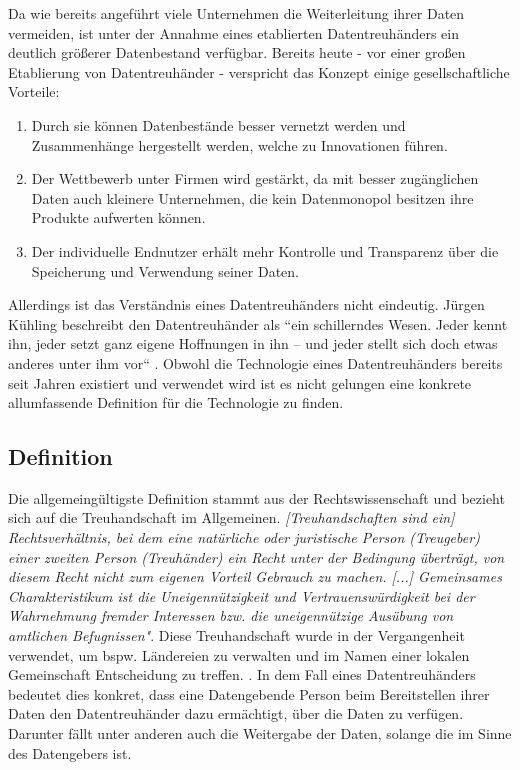 \documentclass[11pt,a4paper]{scrreprt}
\begin{document}
Da wie bereits angeführt viele Unternehmen die Weiterleitung ihrer Daten vermeiden, ist unter der Annahme eines etablierten Datentreuhänders ein deutlich größerer Datenbestand verfügbar. Bereits heute - vor einer großen Etablierung von Datentreuhänder - verspricht das Konzept einige gesellschaftliche Vorteile: \cite{dt-richter2020ddvtalk}
\begin{enumerate}
    \item Durch sie können Datenbestände besser vernetzt werden und Zusammenhänge hergestellt werden, welche zu Innovationen führen.
    \item Der Wettbewerb unter Firmen wird gestärkt, da mit besser zugänglichen Daten auch kleinere Unternehmen, die kein Datenmonopol besitzen ihre Produkte aufwerten können.
    \item Der individuelle Endnutzer erhält mehr Kontrolle und Transparenz über die Speicherung und Verwendung seiner Daten.
\end{enumerate}

Allerdings ist das Verständnis eines Datentreuhänders nicht eindeutig. Jürgen Kühling beschreibt den Datentreuhänder als ``ein schillerndes Wesen. Jeder kennt ihn, jeder setzt ganz eigene Hoffnungen in ihn – und jeder stellt sich doch etwas anderes unter ihm vor`` \cite{dt-kuhling2021datentreuhander}. Obwohl die Technologie eines Datentreuhänders bereits seit Jahren existiert und verwendet wird \cite{dt-hardinges2018data} ist es nicht gelungen eine konkrete allumfassende Definition für die Technologie zu finden.

\subsection{Definition}
Die allgemeingültigste Definition stammt aus der Rechtswissenschaft und bezieht sich auf die Treuhandschaft im Allgemeinen. \textit{[Treuhandschaften sind ein] Rechtsverhältnis, bei dem eine natürliche oder juristische Person (Treugeber) einer zweiten Person (Treuhänder) ein Recht unter der Bedingung überträgt, von diesem Recht nicht zum eigenen Vorteil Gebrauch zu machen. [...] Gemeinsames Charakteristikum ist die Uneigennützigkeit und Vertrauenswürdigkeit bei der Wahrnehmung fremder Interessen bzw. die uneigennützige Ausübung von amtlichen Befugnissen"}\cite{dt-beeck2013treuhandschaft}. Diese Treuhandschaft wurde in der Vergangenheit verwendet, um bspw. Ländereien zu verwalten und im Namen einer lokalen Gemeinschaft Entscheidung zu treffen. \cite{dt-hardinges2018data}. In dem Fall eines Datentreuhänders bedeutet dies konkret, dass eine Datengebende Person beim Bereitstellen ihrer Daten den Datentreuhänder dazu ermächtigt, über die Daten zu verfügen. Darunter fällt unter anderen auch die Weitergabe der Daten, solange die im Sinne des Datengebers ist. 
\end{document}
